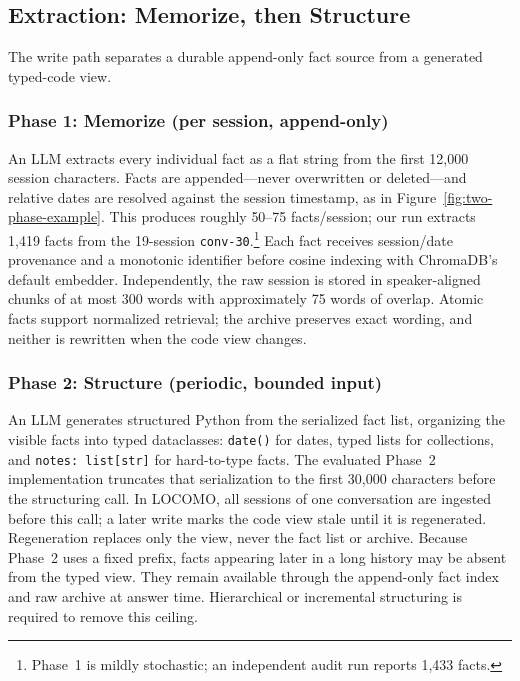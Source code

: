 \subsection{Extraction: Memorize, then Structure}
\label{sec:extraction}

The write path separates a durable append-only fact source from a generated typed-code view.

\subsubsection{Phase 1: Memorize (per session, append-only)}

An LLM extracts every individual fact as a flat string from the first 12{,}000 session characters. Facts are appended---never overwritten or deleted---and relative dates are resolved against the session timestamp, as in Figure~\ref{fig:two-phase-example}. This produces roughly 50--75 facts/session; our run extracts 1{,}419 facts from the 19-session \texttt{conv-30}.\footnote{Phase~1 is mildly stochastic; an independent audit run reports 1{,}433 facts.} Each fact receives session/date provenance and a monotonic identifier before cosine indexing with ChromaDB's default embedder. Independently, the raw session is stored in speaker-aligned chunks of at most 300 words with approximately 75 words of overlap. Atomic facts support normalized retrieval; the archive preserves exact wording, and neither is rewritten when the code view changes.

\subsubsection{Phase 2: Structure (periodic, bounded input)}

An LLM generates structured Python from the serialized fact list, organizing the visible facts into typed dataclasses: \texttt{date()} for dates, typed lists for collections, and \texttt{notes: list[str]} for hard-to-type facts. The evaluated Phase~2 implementation truncates that serialization to the first 30{,}000 characters before the structuring call. In LOCOMO, all sessions of one conversation are ingested before this call; a later write marks the code view stale until it is regenerated. Regeneration replaces only the view, never the fact list or archive. Because Phase~2 uses a fixed prefix, facts appearing later in a long history may be absent from the typed view. They remain available through the append-only fact index and raw archive at answer time. Hierarchical or incremental structuring is required to remove this ceiling.

